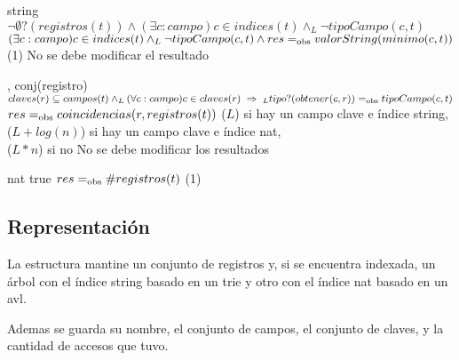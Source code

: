 {   }
{string}
{$\neg\emptyset?(registros(t)) \land
    (\exists c : campo) c \in indices(t) \land_L \neg tipoCampo(c,t)$}
{$(\exists c : campo) c \in indices(t) \land_L \neg tipoCampo(c,t) \land
    res =_{\mathrm{obs}} valorString(minimo(c,t))$}
{\bigo(1)}
{No se debe modificar el resultado}
{}

{   ,
    }
{conj(registro)}
{$claves(r) \subseteq campos(t) \land_L (\forall c : campo) c \in claves(r) \implies_L tipo?(obtener(c,r)) \igobs tipoCampo(c,t)$}
{$res =_{\mathrm{obs}} coincidencias(r, registros(t))$}
{\bigo($L$) si hay un campo clave e índice string, \\
    \hspace*{4em} \bigo($L + log(n)$) si hay un campo clave e índice nat, \\
    \hspace*{4em} \bigo($L * n$) si no}
{No se debe modificar los resultados}
{}

{   }
{nat}
{true}
{$res =_{\mathrm{obs}} \#registros(t)$}
{\bigo(1)}
{}
{}

\subsection{Representación}

La estructura mantine un conjunto de registros y, si se encuentra indexada, un árbol con el índice string basado en un trie y otro con el índice nat basado en un avl.

Ademas se guarda su nombre, el conjunto de campos, el conjunto de claves, y la cantidad de accesos que tuvo.

\vspace*{2em}




